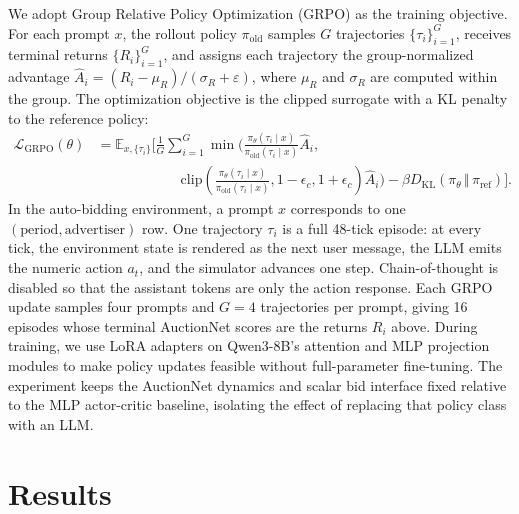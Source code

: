 \documentclass{article}
\begin{document}
We adopt Group Relative Policy Optimization (GRPO) as the training objective. For each prompt
\(x\), the rollout policy \(\pi_{\mathrm{old}}\) samples \(G\) trajectories
\(\{\tau_i\}_{i=1}^{G}\), receives terminal returns \(\{R_i\}_{i=1}^G\), and assigns each
trajectory the group-normalized advantage
\(\hat A_i=(R_i-\mu_R)/(\sigma_R+\varepsilon)\), where \(\mu_R\) and
\(\sigma_R\) are computed within the group. The optimization objective is the clipped surrogate
with a KL penalty to the reference policy:
\begin{equation}
\begin{split}
  \mathcal{L}_{\mathrm{GRPO}}(\theta)
  &=
  \mathbb{E}_{x,\{\tau_i\}}\Bigg[
  \frac{1}{G}\sum_{i=1}^{G}
  \min\!\Bigg(
    \frac{\pi_\theta(\tau_i\mid x)}
         {\pi_{\mathrm{old}}(\tau_i\mid x)}\hat A_i, \\
  &\qquad\qquad\qquad
    \mathrm{clip}\!\left(
      \frac{\pi_\theta(\tau_i\mid x)}
           {\pi_{\mathrm{old}}(\tau_i\mid x)},
      1-\epsilon_c,1+\epsilon_c
    \right)\hat A_i
  \Bigg)
  - \beta D_{\mathrm{KL}}(\pi_\theta\,\Vert\,\pi_{\mathrm{ref}})
  \Bigg].
\end{split}
\end{equation}
In the auto-bidding environment, a prompt \(x\) corresponds to one
\((\text{period},\text{advertiser})\) row. One trajectory \(\tau_i\) is a full
48-tick episode: at every tick, the environment state is rendered as the next
user message, the LLM emits the numeric action \(a_t\), and the simulator advances one
step. Chain-of-thought is disabled so that the assistant tokens are only the
action response. Each GRPO update samples four prompts and \(G=4\) trajectories
per prompt, giving 16 episodes whose terminal AuctionNet scores are the returns
\(R_i\) above. During training, we use LoRA adapters on Qwen3-8B's attention
and MLP projection modules to make policy updates feasible without
full-parameter fine-tuning. The experiment keeps
the AuctionNet dynamics and scalar bid interface fixed relative to the MLP
actor-critic baseline, isolating the effect of replacing that policy class with
an LLM.

\section{Results}
\end{document}
